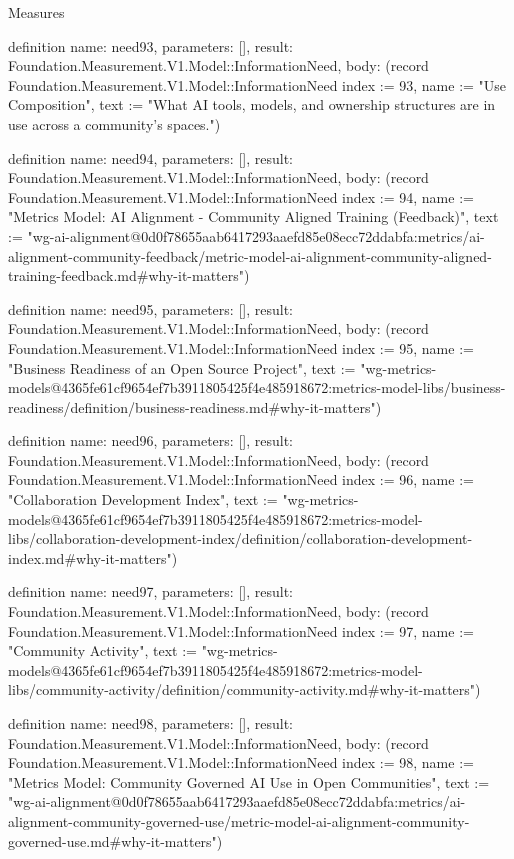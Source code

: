 \begin{lexlean}{Measures}
\begin{semanticmodule}
definition{
  name: need93,
  parameters: [],
  result: Foundation.Measurement.V1.Model::InformationNeed,
  body: (record Foundation.Measurement.V1.Model::InformationNeed {index := 93, name := "Use Composition", text := "What AI tools, models, and ownership structures are in use across a community's spaces."})
}

definition{
  name: need94,
  parameters: [],
  result: Foundation.Measurement.V1.Model::InformationNeed,
  body: (record Foundation.Measurement.V1.Model::InformationNeed {index := 94, name := "Metrics Model: AI Alignment - Community Aligned Training (Feedback)", text := "wg-ai-alignment@0d0f78655aab6417293aaefd85e08ecc72ddabfa:metrics/ai-alignment-community-feedback/metric-model-ai-alignment-community-aligned-training-feedback.md#why-it-matters"})
}

definition{
  name: need95,
  parameters: [],
  result: Foundation.Measurement.V1.Model::InformationNeed,
  body: (record Foundation.Measurement.V1.Model::InformationNeed {index := 95, name := "Business Readiness of an Open Source Project", text := "wg-metrics-models@4365fe61cf9654ef7b3911805425f4e485918672:metrics-model-libs/business-readiness/definition/business-readiness.md#why-it-matters"})
}

definition{
  name: need96,
  parameters: [],
  result: Foundation.Measurement.V1.Model::InformationNeed,
  body: (record Foundation.Measurement.V1.Model::InformationNeed {index := 96, name := "Collaboration Development Index", text := "wg-metrics-models@4365fe61cf9654ef7b3911805425f4e485918672:metrics-model-libs/collaboration-development-index/definition/collaboration-development-index.md#why-it-matters"})
}

definition{
  name: need97,
  parameters: [],
  result: Foundation.Measurement.V1.Model::InformationNeed,
  body: (record Foundation.Measurement.V1.Model::InformationNeed {index := 97, name := "Community Activity", text := "wg-metrics-models@4365fe61cf9654ef7b3911805425f4e485918672:metrics-model-libs/community-activity/definition/community-activity.md#why-it-matters"})
}

definition{
  name: need98,
  parameters: [],
  result: Foundation.Measurement.V1.Model::InformationNeed,
  body: (record Foundation.Measurement.V1.Model::InformationNeed {index := 98, name := "Metrics Model: Community Governed AI Use in Open Communities", text := "wg-ai-alignment@0d0f78655aab6417293aaefd85e08ecc72ddabfa:metrics/ai-alignment-community-governed-use/metric-model-ai-alignment-community-governed-use.md#why-it-matters"})
}


\end{semanticmodule}
\end{lexlean}
